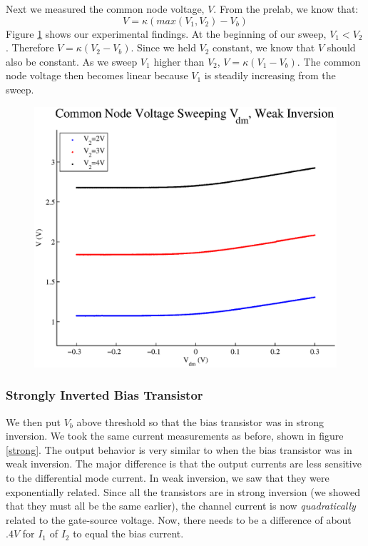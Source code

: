 \documentclass{article}
\begin{document}
Next we measured the common node voltage, $V$. From the prelab, we know that: \[V= \kappa (max(V_1,V_2)-V_b)\]
Figure \ref{weakV} shows our experimental findings. At the beginning of our sweep, $V_1<V_2$. Therefore $V=\kappa(V_2-V_b)$. Since we held $V_2$ constant, we know that $V$ should also be constant. As we sweep $V_1$ higher than $V_2$, $V=\kappa(V_1-V_b)$. The common node voltage then becomes linear because $V_1$ is steadily increasing from the sweep. 

\begin{figure}[H]
\centering
\includegraphics[scale=.7]{plot_weak_v.eps}
\label{weakV}
\caption{}
\end{figure}

\subsubsection*{Strongly Inverted Bias Transistor}

We then put $V_b$ above threshold so that the bias transistor was in strong inversion. We took the same current measurements as before, shown in figure \ref{strong}. The output behavior is very similar to when the bias transistor was in weak inversion. The major difference is that the output currents are less sensitive to the differential mode current. In weak inversion, we saw that they were exponentially related. Since all the transistors are in strong inversion (we showed that they must all be the same earlier), the channel current is now \emph{quadratically} related to the gate-source voltage. Now, there needs to be a difference of about $.4V$ for $I_1$ of $I_2$ to equal the bias current.
\end{document}
